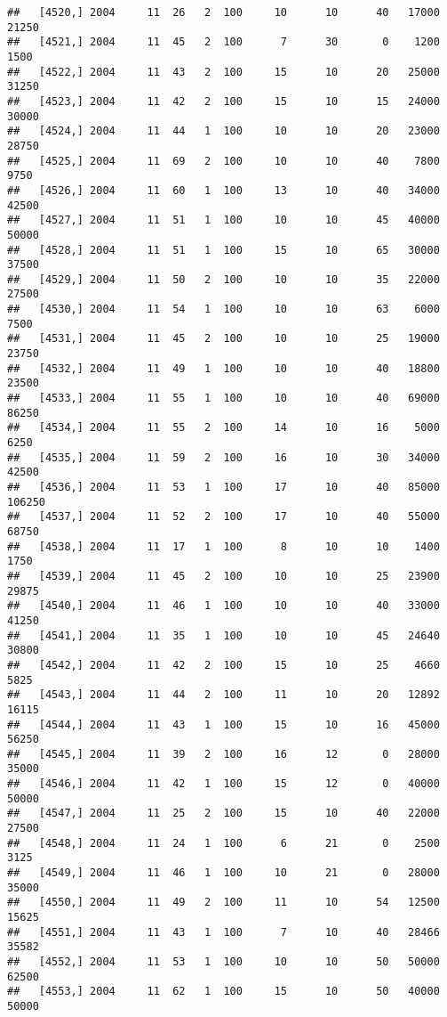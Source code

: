 \documentclass{article}\usepackage[]{graphicx}\usepackage[]{color}
\makeatletter
\newenvironment{kframe}{%
 \def\at@end@of@kframe{}%
 \ifinner\ifhmode%
  \def\at@end@of@kframe{\end{minipage}}%
  \begin{minipage}{\columnwidth}%
 \fi\fi%
 \def\FrameCommand##1{\hskip\@totalleftmargin \hskip-\fboxsep
 \colorbox{shadecolor}{##1}\hskip-\fboxsep
     \hskip-\linewidth \hskip-\@totalleftmargin \hskip\columnwidth}%
 \MakeFramed {\advance\hsize-\width
   \@totalleftmargin\z@ \linewidth\hsize
   \@setminipage}}%
 {\par\unskip\endMakeFramed%
 \at@end@of@kframe}
\newenvironment{knitrout}{}{} %
\makeatother
\begin{document}
\begin{knitrout}
\begin{kframe}
\begin{verbatim}
##   [4520,] 2004     11  26   2  100     10      10      40   17000   21250
##   [4521,] 2004     11  45   2  100      7      30       0    1200    1500
##   [4522,] 2004     11  43   2  100     15      10      20   25000   31250
##   [4523,] 2004     11  42   2  100     15      10      15   24000   30000
##   [4524,] 2004     11  44   1  100     10      10      20   23000   28750
##   [4525,] 2004     11  69   2  100     10      10      40    7800    9750
##   [4526,] 2004     11  60   1  100     13      10      40   34000   42500
##   [4527,] 2004     11  51   1  100     10      10      45   40000   50000
##   [4528,] 2004     11  51   1  100     15      10      65   30000   37500
##   [4529,] 2004     11  50   2  100     10      10      35   22000   27500
##   [4530,] 2004     11  54   1  100     10      10      63    6000    7500
##   [4531,] 2004     11  45   2  100     10      10      25   19000   23750
##   [4532,] 2004     11  49   1  100     10      10      40   18800   23500
##   [4533,] 2004     11  55   1  100     10      10      40   69000   86250
##   [4534,] 2004     11  55   2  100     14      10      16    5000    6250
##   [4535,] 2004     11  59   2  100     16      10      30   34000   42500
##   [4536,] 2004     11  53   1  100     17      10      40   85000  106250
##   [4537,] 2004     11  52   2  100     17      10      40   55000   68750
##   [4538,] 2004     11  17   1  100      8      10      10    1400    1750
##   [4539,] 2004     11  45   2  100     10      10      25   23900   29875
##   [4540,] 2004     11  46   1  100     10      10      40   33000   41250
##   [4541,] 2004     11  35   1  100     10      10      45   24640   30800
##   [4542,] 2004     11  42   2  100     15      10      25    4660    5825
##   [4543,] 2004     11  44   2  100     11      10      20   12892   16115
##   [4544,] 2004     11  43   1  100     15      10      16   45000   56250
##   [4545,] 2004     11  39   2  100     16      12       0   28000   35000
##   [4546,] 2004     11  42   1  100     15      12       0   40000   50000
##   [4547,] 2004     11  25   2  100     15      10      40   22000   27500
##   [4548,] 2004     11  24   1  100      6      21       0    2500    3125
##   [4549,] 2004     11  46   1  100     10      21       0   28000   35000
##   [4550,] 2004     11  49   2  100     11      10      54   12500   15625
##   [4551,] 2004     11  43   1  100      7      10      40   28466   35582
##   [4552,] 2004     11  53   1  100     10      10      50   50000   62500
##   [4553,] 2004     11  62   1  100     15      10      50   40000   50000

\end{verbatim}
\end{kframe}
\end{knitrout}
\end{document}
